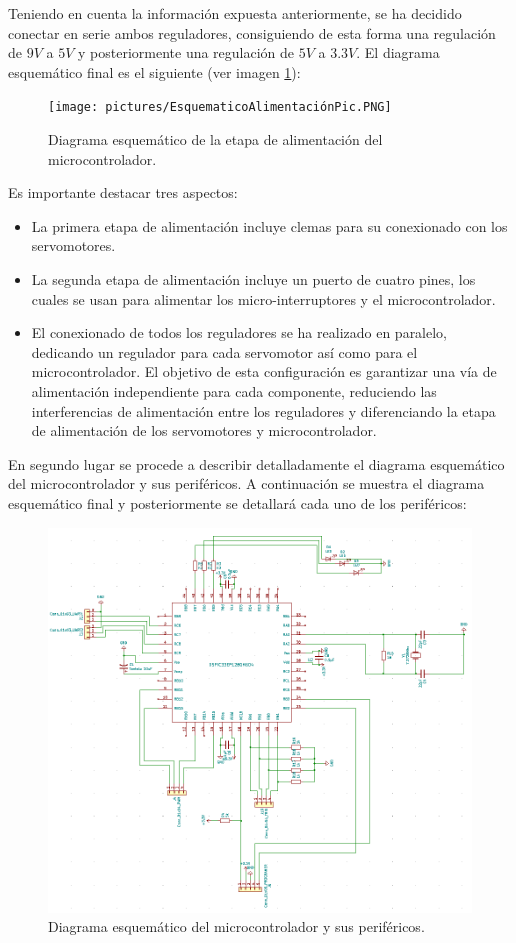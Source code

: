 Teniendo en cuenta la información expuesta anteriormente, se ha decidido conectar en serie ambos reguladores, consiguiendo de esta forma una regulación de $9V$ a $5V$ y posteriormente una regulación de $5V$ a $3.3V$. El diagrama esquemático final es el siguiente (ver imagen \ref{fig:Esquematico_Alimentación}):

    \begin{figure}[H]
    \centering 
    \texttt{[image: pictures/EsquematicoAlimentaciónPic.PNG]}
    \caption{Diagrama esquemático de la etapa de alimentación del microcontrolador.}
    \label{fig:Esquematico_Alimentación}
    \end{figure}

Es importante destacar tres aspectos:
\begin{itemize}
    \item La primera etapa de alimentación incluye clemas para su conexionado con los servomotores.
    \item La segunda etapa de alimentación incluye un puerto de cuatro pines, los cuales se usan para alimentar los micro-interruptores y el microcontrolador.
    \item El conexionado de todos los reguladores se ha realizado en paralelo, dedicando un regulador para cada servomotor así como para el microcontrolador. El objetivo de esta configuración es garantizar una vía de alimentación independiente para cada componente, reduciendo las interferencias de alimentación entre los reguladores y diferenciando la etapa de alimentación de los servomotores y microcontrolador.
\end{itemize}

En segundo lugar se procede a describir detalladamente el diagrama esquemático del microcontrolador y sus periféricos. A continuación se muestra el diagrama esquemático final y posteriormente se detallará cada uno de los periféricos:

\begin{figure}[H]
    \centering 
    \includegraphics[width=.95\linewidth]{pictures/EsquematicoMicrocontrolador.PNG}
    \caption{Diagrama esquemático del microcontrolador y sus periféricos.}
    \label{fig:Esquematico_Final}
\end{figure}

